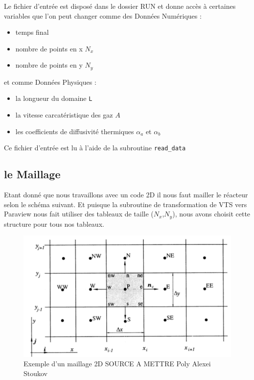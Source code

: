 \documentclass[a4paper,oneside]{article}
\makeatletter
\def\bigcenter{\trivlist \bigcentering\item\relax}
\def\bigcentering{\let\\\@centercr\rightskip\@bigflushglue%
\leftskip\@bigflushglue
\parindent\z@\parfillskip\z@skip}
\makeatother
\begin{document}
Le fichier d'entrée est disposé dans le dossier RUN et donne accès à certaines variables que l'on peut changer comme des Données Numériques :
\begin{itemize}
	\item temps final
	\item nombre de points en x $N_x$
	\item nombre de points en y $N_y$
\end{itemize}

et comme Données Physiques :
\begin{itemize}
	\item la longueur du domaine \verb?L?
	\item la vitesse carcatéristique des gaz $A$
	\item les coefficients de diffusivité thermiques $\alpha_a$ et $\alpha_b$
\end{itemize}

Ce fichier d'entrée est lu à l'aide de la subroutine \verb?read_data?



\subsection{le Maillage}
Etant donné que nous travaillons avec un code 2D il nous faut mailler le réacteur selon le schéma suivant.
Et puisque la subroutine de transformation de VTS vers Paraview nous fait utiliser des tableaux de taille ($N_x$,$N_y$), nous avons choisit cette structure pour tous nos tableaux.

\begin{figure}[h!]
\bigcenter
\includegraphics[scale=0.5]{Champ_Vitesse_Maillage/MaillageTheorique.PNG}
\caption{Exemple d'un maillage 2D SOURCE A METTRE Poly Alexei Stoukov}
\end{figure}
\end{document}
